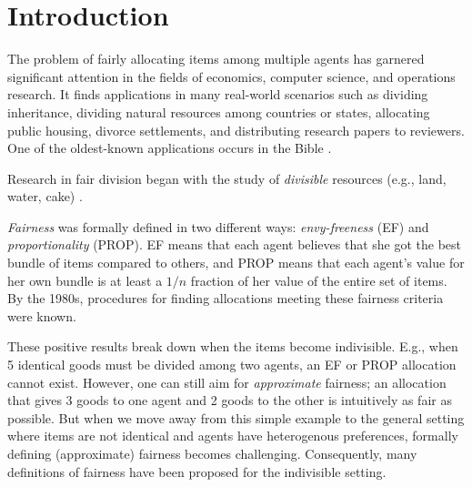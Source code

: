 \section{Introduction}
\label{sec:intro}

The problem of fairly allocating items among multiple agents has garnered significant attention in the fields of economics, computer science, and operations research.
It finds applications in many real-world scenarios such as dividing inheritance, dividing natural resources among countries or states, allocating public housing, divorce settlements, and distributing research papers to reviewers.
One of the oldest-known applications occurs in the Bible \cite{bible_cut_and_choose}.

Research in fair division began with the study of \emph{divisible} resources (e.g., land, water, cake)
\cite{steinhaus1940sur,stromquist1980how,varian1974equity}.

\emph{Fairness} was formally defined in two different ways:
\emph{envy-freeness} (EF) and \emph{proportionality} (PROP).
EF means that each agent believes that she got the best bundle of items compared to others,
and PROP means that each agent's value for her own bundle is at least a $1/n$ fraction
of her value of the entire set of items.
By the 1980s, procedures for finding allocations meeting these fairness criteria were known.

These positive results break down when the items become indivisible.
E.g., when 5 identical goods must be divided among two agents,
an EF or PROP allocation cannot exist.
However, one can still aim for \emph{approximate} fairness;
an allocation that gives 3 goods to one agent and 2 goods to the other
is intuitively as fair as possible.
But when we move away from this simple example to the general setting where
items are not identical and agents have heterogenous preferences,
formally defining (approximate) fairness becomes challenging.
Consequently, many definitions of fairness have been proposed for the indivisible setting.

